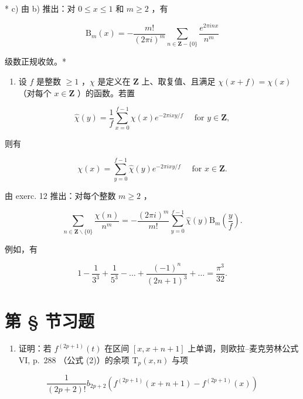 * c) 由 b) 推出：对 \(0 \leqslant x \leqslant 1\) 和 \(m \geqslant 2\) ，有

\[
\mathrm{B} _ {m} (x) = - \frac {m !}{(2 \pi i) ^ {m}} \sum_ {n \in \mathbf {Z} - \{0 \}} \frac {e ^ {2 \pi i n x}}{n ^ {m}}
\]

级数正规收敛。*

\begin{enumerate}
\def\labelenumi{\arabic{enumi})}
\setcounter{enumi}{12}
\tightlist
\item
  设 \(f\) 是整数 \(\geqslant 1\) ，\(\chi\) 是定义在 \(\mathbf{Z}\) 上、取复值、且满足 \(\chi(x + f) = \chi(x)\) （对每个 \(x \in \mathbf{Z}\) ）的函数。若置
\end{enumerate}

\[
\hat {\chi} (y) = \frac {1}{f} \sum_ {x = 0} ^ {f - 1} \chi (x) e ^ {- 2 \pi i x y / f} \quad \text { for } y \in \mathbf {Z},
\]

则有

\[
\chi (x) = \sum_ {y = 0} ^ {f - 1} \hat {\chi} (y) e ^ {- 2 \pi i x y / f} \quad \text {   for   } x \in \mathbf {Z}.
\]

由 exerc. 12 推出：对每个整数 \(m \geqslant 2\) ，

\[
\sum_ {n \in \mathbf {Z} \backslash \{0 \}} \frac {\chi (n)}{n ^ {m}} = - \frac {(2 \pi i) ^ {m}}{m !} \sum_ {y = 0} ^ {f - 1} \hat {\chi} (y) \mathrm{B} _ {m} \left(\frac {y}{f}\right).
\]

例如，有

\[
1 - \frac {1}{3 ^ {3}} + \frac {1}{5 ^ {3}} - \dots + \frac {(- 1) ^ {n}}{(2 n + 1) ^ {3}} + \dots = \frac {\pi^ {3}}{3 2}.
\]

\setcounter{exercisegroup}{2}
\section*{第 \S{} 节习题}
{}

\begin{enumerate}
\def\labelenumi{\arabic{enumi})}
\tightlist
\item
  证明：若 \(f^{(2p + 1)}(t)\) 在区间 \([x, x + n + 1]\) 上单调，则欧拉–麦克劳林公式 VI, p.~288 （公式 (2)）的余项 \(\mathrm{T}_p(x, n)\) 与项
\end{enumerate}

\[
\frac {1}{(2 p + 2) !} b _ {2 p + 2} \left(f ^ {(2 p + 1)} (x + n + 1) - f ^ {(2 p + 1)} (x)\right)
\]

